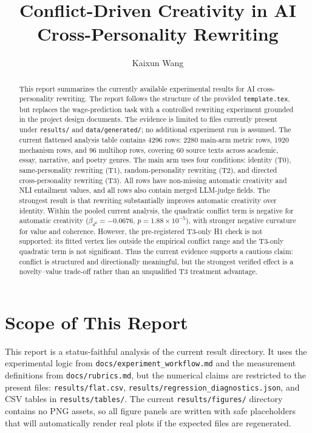\documentclass[sigconf,nonacm]{acmart}
\title{Conflict-Driven Creativity in AI Cross-Personality Rewriting}
\author{Kaixun Wang}
\affiliation{
  \institution{Southern University of Science and Technology}
  \city{Shenzhen}
  \country{China}
}
\begin{document}
\begin{abstract}
This report summarizes the currently available experimental results for AI cross-personality rewriting.
The report follows the structure of the provided \texttt{template.tex}, but replaces the wage-prediction task with a controlled rewriting experiment grounded in the project design documents.
The evidence is limited to files currently present under \texttt{results/} and \texttt{data/generated/}; no additional experiment run is assumed.
The current flattened analysis table contains 4296 rows: 2280 main-arm metric rows, 1920 mechanism rows, and 96 multihop rows, covering 60 source texts across academic, essay, narrative, and poetry genres.
The main arm uses four conditions: identity (T0), same-personality rewriting (T1), random-personality rewriting (T2), and directed cross-personality rewriting (T3).
All rows have non-missing automatic creativity and NLI entailment values, and all rows also contain merged LLM-judge fields.
The strongest result is that rewriting substantially improves automatic creativity over identity.
Within the pooled current analysis, the quadratic conflict term is negative for automatic creativity ($\beta_{d^2}=-0.0676$, $p=1.88\times10^{-5}$), with stronger negative curvature for value and coherence.
However, the pre-registered T3-only H1 check is not supported: its fitted vertex lies outside the empirical conflict range and the T3-only quadratic term is not significant.
Thus the current evidence supports a cautious claim: conflict is structured and directionally meaningful, but the strongest verified effect is a novelty--value trade-off rather than an unqualified T3 treatment advantage.
\end{abstract}


\maketitle

\section{Scope of This Report}

This report is a status-faithful analysis of the current result directory.
It uses the experimental logic from \texttt{docs/experiment\_workflow.md} and the measurement definitions from \texttt{docs/rubrics.md}, but the numerical claims are restricted to the present files:
\texttt{results/flat.csv}, \texttt{results/regression\_diagnostics.json}, and CSV tables in \texttt{results/tables/}.
The current \texttt{results/figures/} directory contains no PNG assets, so all figure panels are written with safe placeholders that will automatically render real plots if the expected files are regenerated.
\end{document}
